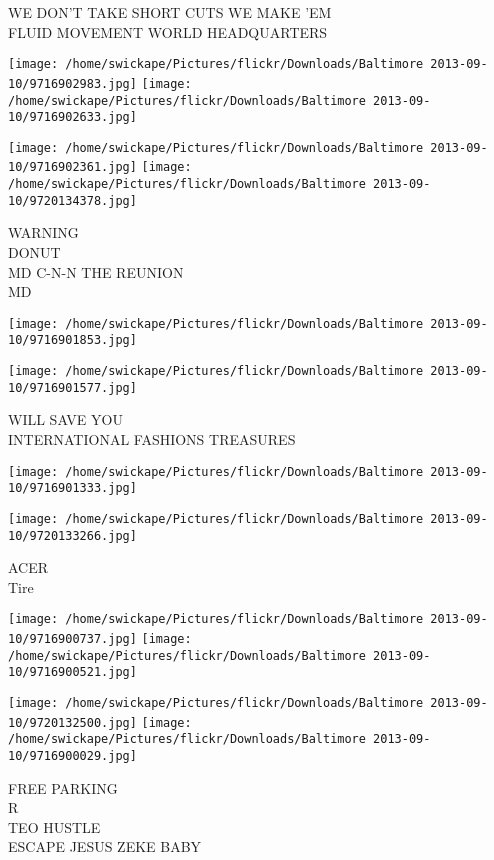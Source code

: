 \documentclass[10pt,letterpaper]{article}
\begin{document}
WE DON'T TAKE SHORT CUTS WE MAKE 'EM\\
FLUID MOVEMENT WORLD HEADQUARTERS\\
\pagebreak

\texttt{[image: /home/swickape/Pictures/flickr/Downloads/Baltimore 2013-09-10/9716902983.jpg]}
\texttt{[image: /home/swickape/Pictures/flickr/Downloads/Baltimore 2013-09-10/9716902633.jpg]}

\texttt{[image: /home/swickape/Pictures/flickr/Downloads/Baltimore 2013-09-10/9716902361.jpg]}
\texttt{[image: /home/swickape/Pictures/flickr/Downloads/Baltimore 2013-09-10/9720134378.jpg]}

WARNING\\
DONUT\\
MD C{-}N{-}N THE REUNION\\
MD\\
\pagebreak

\texttt{[image: /home/swickape/Pictures/flickr/Downloads/Baltimore 2013-09-10/9716901853.jpg]}

\vspace{0.25in}
\texttt{[image: /home/swickape/Pictures/flickr/Downloads/Baltimore 2013-09-10/9716901577.jpg]}

WILL SAVE YOU\\
INTERNATIONAL FASHIONS TREASURES\\
\pagebreak

\texttt{[image: /home/swickape/Pictures/flickr/Downloads/Baltimore 2013-09-10/9716901333.jpg]}

\vspace{0.25in}
\texttt{[image: /home/swickape/Pictures/flickr/Downloads/Baltimore 2013-09-10/9720133266.jpg]}

ACER\\
Tire\\
\pagebreak

\texttt{[image: /home/swickape/Pictures/flickr/Downloads/Baltimore 2013-09-10/9716900737.jpg]}
\texttt{[image: /home/swickape/Pictures/flickr/Downloads/Baltimore 2013-09-10/9716900521.jpg]}

\texttt{[image: /home/swickape/Pictures/flickr/Downloads/Baltimore 2013-09-10/9720132500.jpg]}
\texttt{[image: /home/swickape/Pictures/flickr/Downloads/Baltimore 2013-09-10/9716900029.jpg]}

FREE PARKING\\
R\\
TEO HUSTLE\\
ESCAPE JESUS ZEKE BABY\\
\pagebreak
\end{document}
